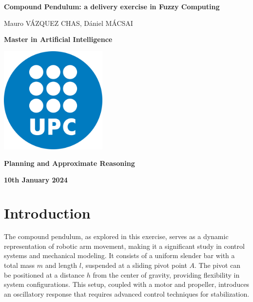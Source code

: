 \documentclass[12pt]{article}
\begin{document}
\begin{titlepage}
    \centering
    \vspace*{3cm}
    {\Huge\bfseries Compound Pendulum: a delivery exercise in Fuzzy Computing\par}
    \vspace{1.5cm}
    {\large Mauro VÁZQUEZ CHAS, Dániel MÁCSAI \par}
    \vspace{3cm}
    {\large \textbf{Master in Artificial Intelligence}\par}
    \includegraphics[width=0.4\textwidth]{Logo_UPC.png}\par\vspace{1cm}
    {\large \textbf{Planning and Approximate Reasoning}\par}
    \vspace{1cm}
    {\large\bfseries 10th January 2024\par}
\end{titlepage}

\pagestyle{empty}

\newpage
\tableofcontents
\newpage

\setcounter{page}{1}
\pagestyle{plain}

\section{Introduction}
\label{sec:introduction}

The compound pendulum, as explored in this exercise, serves as a dynamic representation of robotic arm movement, making it a significant study in control systems and mechanical modeling. It consists of a uniform slender bar with a total mass \( m \) and length \( l \), suspended at a sliding pivot point \( A \). The pivot can be positioned at a distance \( h \) from the center of gravity, providing flexibility in system configurations. This setup, coupled with a motor and propeller, introduces an oscillatory response that requires advanced control techniques for stabilization.
\end{document}
